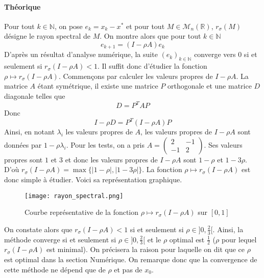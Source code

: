 \documentclass[9pt,a4paper]{article}
\begin{document}
\paragraph{Théorique}
Pour tout $k \in \mathbb{N}$, on pose $e_k = x_k - x^*$ et pour tout $M \in \mathcal{M}_n(\mathbb{R})$, $r_{\sigma}(M)$ désigne le rayon spectral de $M$.\newline
On montre alors que pour tout $k \in \mathbb{N}$
$$
e_{k+1} = (I - \rho A)e_k
$$
D'après un résultat d'analyse numérique, la suite $(e_k)_{k \in \mathbb{N}}$ converge vers $0$ si et seulement si $r_{\sigma}(I - \rho A) < 1$. Il suffit donc d'étudier la fonction $\rho \longmapsto r_{\sigma}(I - \rho A)$.\newline
Commençons par calculer les valeurs propres de $I - \rho A$.\newline
La matrice $A$ étant symétrique, il existe une matrice $P$ orthogonale et une matrice $D$ diagonale telles que
$$
D = P^T A P
$$
Donc
$$
I - \rho D = P^T (I - \rho A) P
$$
Ainsi, en notant $\lambda_i$ les valeurs propres de $A$, les valeurs propres de $I - \rho A$ sont données par $1 - \rho \lambda_i$.\newline
Pour les tests, on a pris $A =
\begin{pmatrix}
    2 & -1\\
    -1 & 2
\end{pmatrix}$. Ses valeurs propres sont $1$ et $3$ et donc les valeurs propres de $I - \rho A$ sont $1 - \rho$ et $1 - 3 \rho$. D'où $r_{\sigma}(I - \rho A) = \max\{|1 - \rho|,|1 - 3 \rho|\}$. La fonction $\rho \longmapsto r_{\sigma}(I - \rho A)$ est donc simple à étudier. 
\newpage
Voici sa représentation graphique.
\begin{figure}[h]
    \centering
    \texttt{[image: rayon\_spectral.png]}
    \caption{Courbe représentative de la fonction $\rho \longmapsto r_{\sigma}(I - \rho A)$ sur $[0, 1]$}
    \label{fig:enter-label}
\end{figure}\newline
On constate alors que $r_{\sigma}(I - \rho A) < 1$ si et seulement si $\rho \in ]0,\frac{2}{3}[$. Ainsi, la méthode converge si et seulement si $\rho \in ]0,\frac{2}{3}[$ et le $\rho$ optimal est $\frac{1}{2}$ ($\rho$ pour lequel $r_{\sigma}(I - \rho A)$ est minimal). On précisera la raison pour laquelle on dit que ce $\rho$ est optimal dans la section Numérique. On remarque donc que la convergence de cette méthode ne dépend que de $\rho$ et pas de $x_0$.
\end{document}
